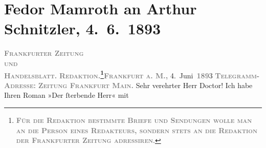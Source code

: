 

         \renewcommand{\erwaehnteInstitutionen}{Institutionen: Frankfurter Zeitung}
         \renewcommand{\erwaehnteOrte}{Orte: Frankfurt am Main, Wien}
         \renewcommand{\erwaehnteWerke}{Werke: Sterben. Novelle}
               \section[Fedor Mamroth an Arthur Schnitzler, 4. 6. 1893]{ Fedor Mamroth an Arthur Schnitzler, 4. 6. 1893}\nopagebreak{}\rehead{ }\begin{ledgroupsized}[t]{13cm}\normalsize\beginnumbering \toendnotes[C]{\smallbreak\pagebreak[2]} 
\toendnotes[C]{\smallbreak}\pstart
           \noindent{}{\pb}\textcolor{gray}{\textbf{\textsc{Frankfurter Zeitung}}}{\\}\textsc{\textcolor{gray}{\textbf{und}}}{\\}\textcolor{gray}{\textbf{\textsc{Handelsblatt.}}}\pend
           \pstart
           \textcolor{gray}{\textbf{\textsc{Redaktion.\footnote{\noindent{}\textcolor{gray}{\textbf{\textsc{Für die Redaktion bestimmte Briefe und
                                       Sendungen wolle man  an die
                                       Person eines Redakteurs, sondern stets \textbf{an die
                                          Redaktion der Frankfurter Zeitung} adressiren}}}.}}}}\hfill \textcolor{gray}{\textbf{\textsc{Frankfurt a. M.,}}}{ }4. Juni \textsc{\textcolor{gray}{\textbf{189}}}3\pend
           \pstart
           \textcolor{gray}{\textbf{\textsc{Telegramm-Adresse:}}}\pend
           \pstart
           \textcolor{gray}{\textbf{\textsc{Zeitung Frankfurt Main.}}}\pend
           \pstart{}Sehr verehrter Herr Doctor!\pend\pstart
           Ich habe Ihren Roman »Der ſterbende Herr« mit

\end{ledgroupsized}
